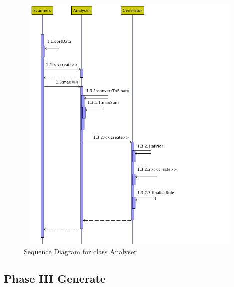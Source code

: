 \begin{description}
\begin{figure}[h]
    \centering
    \includegraphics[width=4.5in, height=5in]{figures/sequence_analyser}
    \caption[Sequence Diagram for class Analyser]{Sequence Diagram for class Analyser}
    \label{fig:figure4_32}
\end{figure}

\end{description}

\subsection{Phase III Generate}

